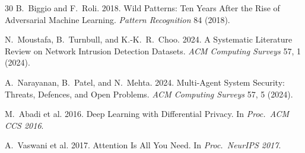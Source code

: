 \documentclass[sigconf,nonacm]{acmart}
\begin{document}
\begin{thebibliography}{30}
B.~Biggio and F.~Roli. 2018. Wild Patterns: Ten Years After the
Rise of Adversarial Machine Learning. \textit{Pattern Recognition}
84 (2018).

N.~Moustafa, B.~Turnbull, and K.-K.~R.~Choo. 2024. A Systematic
Literature Review on Network Intrusion Detection Datasets.
\textit{ACM Computing Surveys} 57, 1 (2024).

A.~Narayanan, B.~Patel, and N.~Mehta. 2024. Multi-Agent System
Security: Threats, Defences, and Open Problems.
\textit{ACM Computing Surveys} 57, 5 (2024).

M.~Abadi et al. 2016. Deep Learning with Differential Privacy.
In \textit{Proc.\ ACM CCS 2016}.

A.~Vaswani et al. 2017. Attention Is All You Need. In
\textit{Proc.\ NeurIPS 2017}.

\end{thebibliography}
\end{document}
